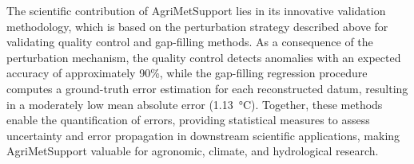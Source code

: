 \documentclass[authoryear,preprint,review,12pt]{elsarticle}
\begin{document}
The scientific contribution of Agri\-Met\-Support lies in its innovative validation methodology, which is based on the perturbation strategy described above for validating quality control and gap-filling methods.
As a consequence of the perturbation mechanism, the quality control detects anomalies with an expected accuracy of approximately 90\%, while the gap-filling regression procedure computes a ground-truth error estimation for each reconstructed datum, resulting in a moderately low mean absolute error (\SI{1.13}{\degreeCelsius}).
Together, these methods enable the quantification of errors,
providing statistical measures to assess uncertainty and error propagation in downstream scientific applications, 
making Agri\-Met\-Support valuable for agronomic, climate, and hydrological research.
\end{document}
